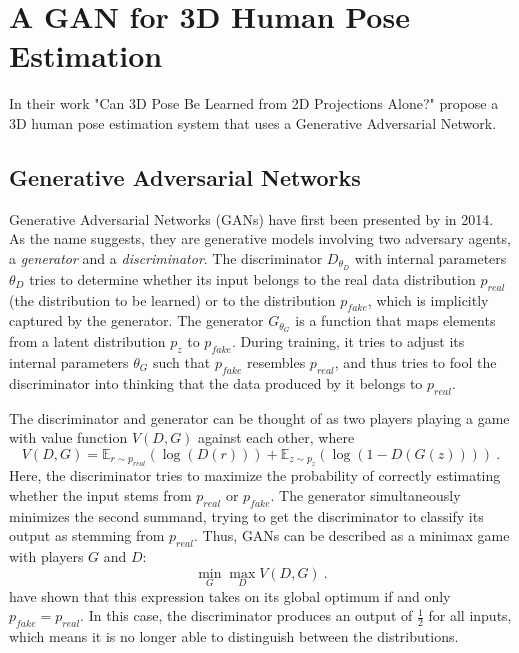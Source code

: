 \section{A GAN for 3D Human Pose Estimation}
\label{sec:network}
In their work "Can 3D Pose Be Learned from 2D Projections Alone?" \citet{drover18} propose a 3D human pose estimation system that uses a Generative Adversarial Network.

\subsection{Generative Adversarial Networks}
Generative Adversarial Networks (GANs) have first been presented by \citet{goodfellow14} in 2014.
As the name suggests, they are generative models involving two adversary agents, a \emph{generator} and a \emph{discriminator}.
The discriminator $D_{\theta_D}$ with internal parameters $\theta_D$ tries to determine whether its input belongs to the real data distribution $p_{real}$ (the distribution to be learned) or to the distribution $p_{fake}$, which is implicitly captured by the generator.
The generator $G_{\theta_G}$ is a function that maps elements from a latent distribution $p_z$ to $p_{fake}$.
During training, it tries to adjust its internal parameters $\theta_G$ such that $p_{fake}$ resembles $p_{real}$, and thus tries to fool the discriminator into thinking that the data produced by it belongs to $p_{real}$.

The discriminator and generator can be thought of as two players playing a game with value function $V(D, G)$ against each other, where
\begin{equation}
	V(D, G) = \mathbb{E}_{r\sim p_{real}}(\log(D(r))) + \mathbb{E}_{z\sim p_{z}}(\log(1 - D(G(z)))) \ .
\end{equation}
Here, the discriminator tries to maximize the probability of correctly estimating whether the input stems from $p_{real}$ or $p_{fake}$.
The generator simultaneously minimizes the second summand, trying to get the discriminator to classify its output as stemming from $p_{real}$.
Thus, GANs can be described as a minimax game with players $G$ and $D$:
\begin{equation}
\min_G \max_D V(D, G) \ .
\end{equation}
\citet{goodfellow14} have shown that this expression takes on its global optimum if and only $p_{fake} = p_{real}$.
In this case, the discriminator produces an output of $\frac{1}{2}$ for all inputs, which means it is no longer able to distinguish between the distributions.


